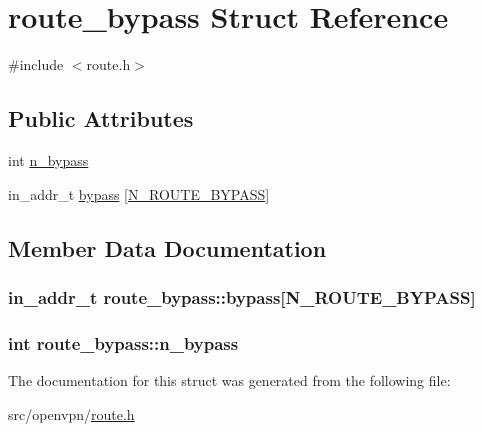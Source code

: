 \hypertarget{structroute__bypass}{}\section{route\+\_\+bypass Struct Reference}
\label{structroute__bypass}


{\ttfamily \#include $<$route.\+h$>$}

\subsection*{Public Attributes}
\begin{DoxyCompactItemize}
\item 
int \hyperlink{structroute__bypass_a6cc77fdcdd9adfcfb1f67919697e5d99}{n\+\_\+bypass}
\item 
in\+\_\+addr\+\_\+t \hyperlink{structroute__bypass_a7cfb89101551414be212ea4394b8e283}{bypass} \mbox{[}\hyperlink{route_8h_acf661cefbfb4628727e3c9d60f1771af}{N\+\_\+\+R\+O\+U\+T\+E\+\_\+\+B\+Y\+P\+A\+S\+S}\mbox{]}
\end{DoxyCompactItemize}


\subsection{Member Data Documentation}
\hypertarget{structroute__bypass_a7cfb89101551414be212ea4394b8e283}{}
\subsubsection[{bypass}]{\setlength{\rightskip}{0pt plus 5cm}in\+\_\+addr\+\_\+t route\+\_\+bypass\+::bypass\mbox{[}{\bf N\+\_\+\+R\+O\+U\+T\+E\+\_\+\+B\+Y\+P\+A\+S\+S}\mbox{]}}\label{structroute__bypass_a7cfb89101551414be212ea4394b8e283}
\hypertarget{structroute__bypass_a6cc77fdcdd9adfcfb1f67919697e5d99}{}
\subsubsection[{n\+\_\+bypass}]{\setlength{\rightskip}{0pt plus 5cm}int route\+\_\+bypass\+::n\+\_\+bypass}\label{structroute__bypass_a6cc77fdcdd9adfcfb1f67919697e5d99}


The documentation for this struct was generated from the following file\+:\begin{DoxyCompactItemize}
\item 
src/openvpn/\hyperlink{route_8h}{route.\+h}\end{DoxyCompactItemize}
